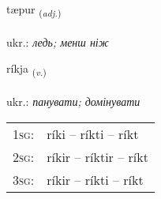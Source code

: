 \documentclass[frontgrid, backgrid]{flacards}\usepackage[]{graphicx}\usepackage[]{xcolor}
\begin{document}
\renewcommand{\flhead}{\vskip5pt \fboxsep=0pt {\small\bfseries\footnotesize Lýsingarorð | прикметник}}
\renewcommand{\fcfoot}{\vskip5pt \fboxsep=0pt \hspace{2pt}{\small\bfseries\footnotesize 2K}}

\renewcommand{\blhead}{\vskip5pt {\small\bfseries\footnotesize Lýsingarorð | прикметник }}
\renewcommand{\bcfoot}{\vskip5pt \hspace{2pt}{\small\bfseries\footnotesize 2K}}


{tæpur \small{\textsubscript{(\textit{adj.})}} \\[1ex] %
\textphonetic{[tʰaiːpʏr]} \\
ukr.: \emph{ледь; менш ніж} \\  [2ex]
\renewcommand*{\arraystretch}{0.8}
}

\renewcommand{\flhead}{\vskip5pt \fboxsep=0pt {\small\bfseries\footnotesize Sagnorð | дієслово}}
\renewcommand{\fcfoot}{\vskip5pt \fboxsep=0pt \hspace{2pt}{\small\bfseries\footnotesize 2K}}

\renewcommand{\blhead}{\vskip5pt {\small\bfseries\footnotesize Sagnorð | дієслово }}
\renewcommand{\bcfoot}{\vskip5pt \hspace{2pt}{\small\bfseries\footnotesize 2K}}


{ríkja \small{\textsubscript{(\textit{v.})}} \\[1ex] %
\textphonetic{[riːca]} \\
ukr.: \emph{панувати; домінувати} \\  [2ex]
\renewcommand*{\arraystretch}{0.8}
\begin{tabular}{p{1cm}l}
\textsc{1sg}: & ríki -- ríkti -- ríkt \\ 
\textsc{2sg}: & ríkir -- ríktir -- ríkt \\ 
\textsc{3sg}: & ríkir -- ríkti -- ríkt \\ 
\end{tabular}
}
\end{document}
